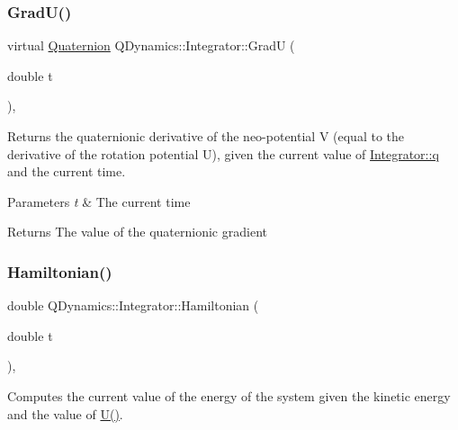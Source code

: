 \subsubsection{\texorpdfstring{Grad\+U()}{GradU()}}
{\footnotesize\ttfamily virtual \hyperlink{classQDynamics_1_1Quaternion}{Quaternion} Q\+Dynamics\+::\+Integrator\+::\+GradU (\begin{DoxyParamCaption}\item[{double}]{t }\end{DoxyParamCaption})\hspace{0.3cm}{\ttfamily [protected]}, {\ttfamily [virtual]}}



Returns the quaternionic derivative of the neo-\/potential V (equal to the derivative of the rotation potential U), given the current value of \hyperlink{classQDynamics_1_1Integrator_a5929511da076c7f31749a6da713fcff6}{Integrator\+::q} and the current time. 


\begin{DoxyParams}{Parameters}
{\em t} & The current time \\
\hline
\end{DoxyParams}
\begin{DoxyReturn}{Returns}
The value of the quaternionic gradient 
\end{DoxyReturn}
\mbox{\label{classQDynamics_1_1Integrator_a816743f6efb41b0b29243ff3bdaa4c9d}} 
\subsubsection{\texorpdfstring{Hamiltonian()}{Hamiltonian()}}
{\footnotesize\ttfamily double Q\+Dynamics\+::\+Integrator\+::\+Hamiltonian (\begin{DoxyParamCaption}\item[{double}]{t }\end{DoxyParamCaption})\hspace{0.3cm}{\ttfamily [inline]}, {\ttfamily [private]}}



Computes the current value of the energy of the system given the kinetic energy and the value of \hyperlink{classQDynamics_1_1Integrator_afa838ba8dfb0fbde1f77c6d2a45a9dd0}{U()}. 



